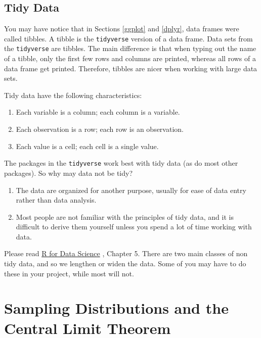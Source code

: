 \documentclass[
]{book}
\providecommand{\tightlist}{%
  \setlength{\itemsep}{0pt}\setlength{\parskip}{0pt}}
\theoremstyle{definition}
\theoremstyle{definition}
\theoremstyle{definition}
\theoremstyle{definition}
\theoremstyle{remark}
\begin{document}
\hypertarget{tidy-data}{%
\section{Tidy Data}\label{tidy-data}}

You may have notice that in Sections \ref{ggplot} and \ref{dplyr}, data frames were called tibbles. A tibble is the \texttt{tidyverse} version of a data frame. Data sets from the \texttt{tidyverse} are tibbles. The main difference is that when typing out the name of a tibble, only the first few rows and columns are printed, whereas all rows of a data frame get printed. Therefore, tibbles are nicer when working with large data sets.

Tidy data have the following characteristics:

\begin{enumerate}
\def\labelenumi{\arabic{enumi}.}
\tightlist
\item
  Each variable is a column; each column is a variable.
\item
  Each observation is a row; each row is an observation.
\item
  Each value is a cell; each cell is a single value.
\end{enumerate}

The packages in the \texttt{tidyverse} work best with tidy data (as do most other packages). So why may data not be tidy?

\begin{enumerate}
\def\labelenumi{\arabic{enumi}.}
\item
  The data are organized for another purpose, usually for ease of data entry rather than data analysis.
\item
  Most people are not familiar with the principles of tidy data, and it is difficult to derive them yourself unless you spend a lot of time working with data.
\end{enumerate}

Please read \href{https://r4ds.hadley.nz/}{R for Data Science} \citep{wickham2023}, Chapter 5. There are two main classes of non tidy data, and so we lengthen or widen the data. Some of you may have to do these in your project, while most will not.

\hypertarget{clt}{%
\chapter{Sampling Distributions and the Central Limit Theorem}\label{clt}}
\end{document}
